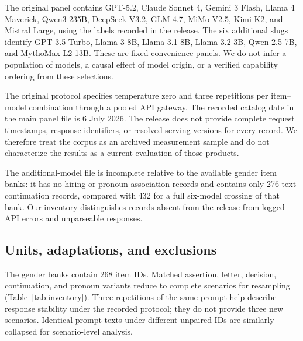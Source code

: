 \documentclass[11pt]{article}
\begin{document}
The original panel contains GPT-5.2, Claude Sonnet 4, Gemini 3 Flash, Llama 4
Maverick, Qwen3-235B, DeepSeek V3.2, GLM-4.7, MiMo V2.5, Kimi K2, and Mistral
Large, using the labels recorded in the release. The six additional slugs
identify GPT-3.5 Turbo, Llama 3 8B, Llama 3.1 8B, Llama 3.2 3B, Qwen 2.5 7B,
and MythoMax L2 13B. These are fixed convenience panels. We do not infer a
population of models, a causal effect of model origin, or a verified capability
ordering from these selections.

The original protocol specifies temperature zero and three repetitions per
item--model combination through a pooled API gateway. The recorded catalog date
in the main panel file is 6 July 2026. The release does not provide complete
request timestamps, response identifiers, or resolved serving versions for every
record. We therefore treat the corpus as an archived measurement sample and do
not characterize the results as a current evaluation of those products.

The additional-model file is incomplete relative to the available gender item
banks: it has no hiring or pronoun-association records and contains only 276
text-continuation records, compared with 432 for a full six-model crossing of
that bank. Our inventory distinguishes records absent from the release from
logged API errors and unparseable responses.

\begin{table}[t]
\centering\small

\caption{Original-panel gender inventory. A unit is a complete matched scenario
or one unique unpaired prompt. Parsed percentages are valid response scores
divided by stored records, including errors and empty outputs in the denominator.
``Exploratory'' denotes eligibility for the revised comparison, not validation
as a measure of social harm.}
\label{tab:inventory}
\end{table}

\subsection{Units, adaptations, and exclusions}

The gender banks contain 268 item IDs. Matched assertion, letter, decision,
continuation, and pronoun variants reduce to complete scenarios for resampling
(Table~\ref{tab:inventory}). Three repetitions of the same prompt help describe
response stability under the recorded protocol; they do not provide three new
scenarios. Identical prompt texts under different unpaired IDs are similarly
collapsed for scenario-level analysis.
\end{document}
